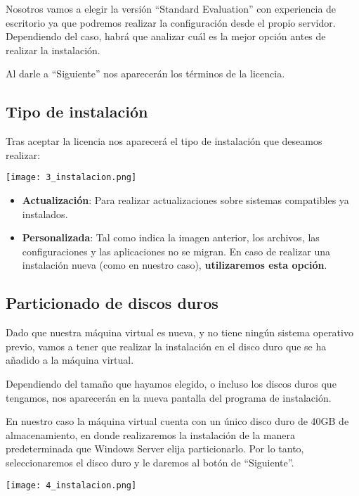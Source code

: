 Nosotros vamos a elegir la versión “Standard Evaluation” con experiencia de escritorio ya que podremos realizar la configuración desde el propio servidor. Dependiendo del caso, habrá que analizar cuál es la mejor opción antes de realizar la instalación.

Al darle a “Siguiente” nos aparecerán los términos de la licencia.

\subsection{Tipo de instalación}
Tras aceptar la licencia nos aparecerá el tipo de instalación que deseamos realizar:
\begin{center}
    \vspace{-10pt}
    \texttt{[image: 3\_instalacion.png]}
    \vspace{-10pt}
\end{center}

\begin{itemize}
    \item \textbf{Actualización}: Para realizar actualizaciones sobre sistemas compatibles ya instalados.
    \item \textbf{Personalizada}: Tal como indica la imagen anterior, los archivos, las configuraciones y las aplicaciones no se migran. En caso de realizar una instalación nueva (como en nuestro caso), \textbf{utilizaremos esta opción}.
\end{itemize}

\subsection{Particionado de discos duros}
Dado que nuestra máquina virtual es nueva, y no tiene ningún sistema operativo previo, vamos a tener que realizar la instalación en el disco duro que se ha añadido a la máquina virtual.

Dependiendo del tamaño que hayamos elegido, o incluso los discos duros que tengamos, nos aparecerán en la nueva pantalla del programa de instalación.

{
    \begin{minipage}{0.6\linewidth}
        \setlength{\parskip}{1.2em}
        En nuestro caso la máquina virtual cuenta con un único disco duro de 40GB de almacenamiento, en donde realizaremos la instalación de la manera predeterminada que Windows Server elija particionarlo. Por lo tanto, seleccionaremos el disco duro y le daremos al botón de “Siguiente”.
    \end{minipage}
    \hfill
    \begin{minipage}{0.36\linewidth}
        \vspace{-11pt}
        \texttt{[image: 4\_instalacion.png]}
    \end{minipage}
}

